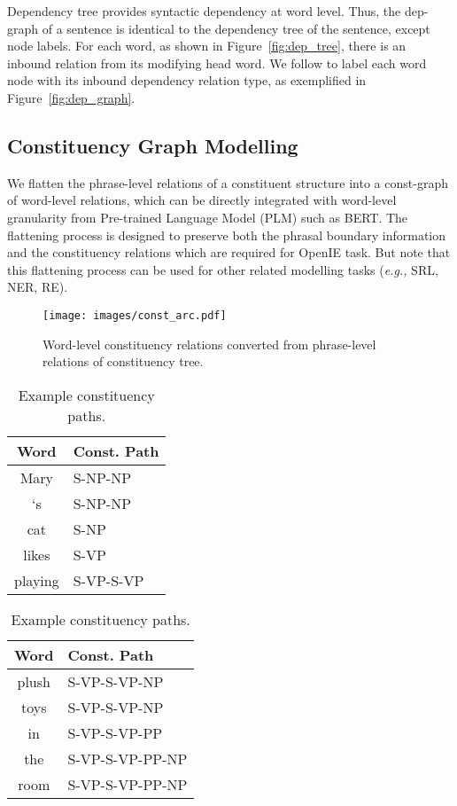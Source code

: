 \documentclass[11pt]{article}
\newcommand{\eg}{\emph{e.g.,}\xspace}
\begin{document}
Dependency tree provides syntactic dependency at word level. Thus, the dep-graph of a sentence is identical to the dependency tree of the sentence, except node labels.
For each word, as shown in Figure~\ref{fig:dep_tree}, there is an inbound relation from its modifying head word. 
We follow \citet{fei-etal-2021-better} to label each word node with its inbound dependency relation type, as exemplified in Figure~\ref{fig:dep_graph}.



\subsection{Constituency Graph Modelling}\label{sec:const_graph}
We flatten the phrase-level relations of a constituent structure into a const-graph of word-level relations, which can be directly integrated with word-level granularity from Pre-trained Language Model (PLM) such as BERT. 
The flattening process is designed to preserve both the phrasal boundary information and the constituency relations which are required for OpenIE task. But note that this flattening process can be used for other related modelling tasks (\eg SRL, NER, RE). 


\begin{figure}
    \centering
    \texttt{[image: images/const\_arc.pdf]}
    \caption{Word-level constituency relations converted from phrase-level relations of constituency tree.}
    \label{fig:const_arc}
\end{figure}


\begin{table}[t]
\small
    \begin{tabular}{c|l}
    \toprule
    Word & Const. Path \\
    \midrule
    Mary & S-NP-NP  \\
    `s & S-NP-NP  \\
    cat & S-NP  \\
    likes & S-VP  \\
    playing & S-VP-S-VP  \\
    \bottomrule
    \end{tabular}
    \quad
    \begin{tabular}{c|l}
    \toprule
    Word & Const. Path \\
    \midrule
    plush & S-VP-S-VP-NP  \\
    toys & S-VP-S-VP-NP  \\
    in & S-VP-S-VP-PP  \\
    the & S-VP-S-VP-PP-NP  \\
    room & S-VP-S-VP-PP-NP \\
    \bottomrule
    \end{tabular}
\caption{Example constituency paths.}
\label{tab:const_path}
\end{table}
\end{document}
